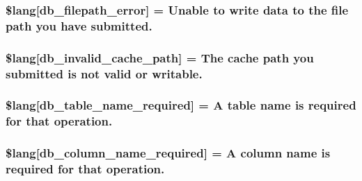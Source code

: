 \subsubsection[{\$lang}]{\setlength{\rightskip}{0pt plus 5cm}\$lang\mbox{[}\textquotesingle{}db\+\_\+filepath\+\_\+error\textquotesingle{}\mbox{]} = \textquotesingle{}Unable to write data to the file path you have submitted.\textquotesingle{}}\label{db__lang_8php_a0519c50a806cec99f29b499aec2582e5}
\hypertarget{db__lang_8php_a67157df2896b342e247ab744adf2b9e5}{}
\subsubsection[{\$lang}]{\setlength{\rightskip}{0pt plus 5cm}\$lang\mbox{[}\textquotesingle{}db\+\_\+invalid\+\_\+cache\+\_\+path\textquotesingle{}\mbox{]} = \textquotesingle{}The cache path you submitted is not valid or writable.\textquotesingle{}}\label{db__lang_8php_a67157df2896b342e247ab744adf2b9e5}
\hypertarget{db__lang_8php_a2899cf8f7246d7fa97660ea52856ade5}{}
\subsubsection[{\$lang}]{\setlength{\rightskip}{0pt plus 5cm}\$lang\mbox{[}\textquotesingle{}db\+\_\+table\+\_\+name\+\_\+required\textquotesingle{}\mbox{]} = \textquotesingle{}A table name is required {\bf for} that operation.\textquotesingle{}}\label{db__lang_8php_a2899cf8f7246d7fa97660ea52856ade5}
\hypertarget{db__lang_8php_ac87ab86a1f105d87327480b6d0659b13}{}
\subsubsection[{\$lang}]{\setlength{\rightskip}{0pt plus 5cm}\$lang\mbox{[}\textquotesingle{}db\+\_\+column\+\_\+name\+\_\+required\textquotesingle{}\mbox{]} = \textquotesingle{}A column name is required {\bf for} that operation.\textquotesingle{}}\label{db__lang_8php_ac87ab86a1f105d87327480b6d0659b13}
\hypertarget{db__lang_8php_ad0ba270704ec81f8f89e486a18660354}{}
